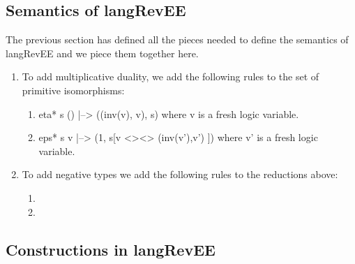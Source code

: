 \documentclass[preprint]{sigplanconf}
\begin{document}
{%
\subsection{Semantics of {{langRevEE}} }

The previous section has defined all the pieces needed to define the
semantics of {{langRevEE}} and we piece them together here. 

\begin{enumerate}
\item 
To add multiplicative duality, we add the following rules to the set
of primitive isomorphisms:

\begin{enumerate}
\item {{eta* s () |--> ((inv(v), v), s)}}
  where {{v}} is a fresh logic variable. 

\item {{eps* s v |--> (1, s[v <><> (inv(v'),v') ])}}
  where {{v'}} is a fresh logic variable. 

\end{enumerate}

\item To add negative types we add the following rules to the
  reductions above: 

  \begin{enumerate}
  \item 


    \item

  \end{enumerate}


\end{enumerate}

\subsection{Constructions in {{langRevEE}} }
\label{sec:monoidal-constructions}

}
\end{document}
